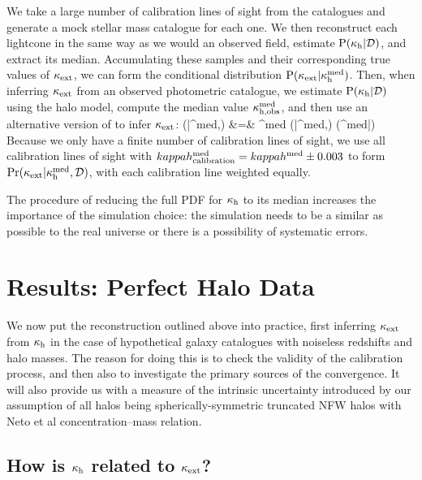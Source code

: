 \documentclass[useAMS,usenatbib,a4paper]{mn2e}
\begin{document}
We  take a large number of
calibration lines of sight from the \MS catalogues and generate a mock
stellar mass catalogue for each one. We then reconstruct each lightcone in the
same way as we would an observed field,
estimate ${\rm P}(\kappa_{\rm h}|{\mathcal{D}})$, and extract its median. Accumulating
these samples and their corresponding true values of $\kappa_{\rm ext}$, we can form the 
conditional distribution ${\rm P}(\kappa_{\rm ext}|\kappa_{\rm h}^{\rm med})$. 
Then, when inferring $\kappa_{\rm ext}$ from an observed photometric catalogue, we 
estimate ${\rm P}(\kappa_{\rm h}|{\mathcal{D}})$ 
using the halo model, compute the median value 
$\kappa_{\rm h,obs}^{\rm med}$, and then use an alternative
version of 
 to infer $\kappa_{\rm ext}$: 
\bea
\Pr(\kappax|\kappah^{\rm med},) &=& \int \dee\kappah^{\rm med} 
   \Pr(\kappax|\kappah^{\rm med},) \Pr(\kappah^{\rm med}|) \notag \\
\label{eq:calkappaconv}   
\eea
Because we only have a finite number of calibration lines of sight, we use all calibration
lines of sight with $kappah_{\rm calibration}^{\rm med} = kappah^{\rm med}\pm0.003$ to form
$\Pr(\kappa_{\rm ext}|\kappa_{\rm h}^{\rm med},\mathcal{D})$, with each calibration line weighted
equally. 

The procedure of reducing the full PDF for $\kappa_{\rm h}$ to its median increases the 
importance of the simulation choice: the simulation needs to be a similar as possible
to the real universe or there is a possibility of systematic errors. 
\section{Results: Perfect Halo Data}
\label{sec:knownMh+z} 

We now put the reconstruction \proceedure outlined above into practice, first
inferring $\kappa_{\rm ext}$ from $\kappa_{\rm h}$ in the case of hypothetical galaxy catalogues
with noiseless redshifts and halo masses. The reason for doing this is to
check the validity of the calibration process, and then also to  investigate
the primary sources of the convergence. It will also provide us with a measure
of the intrinsic uncertainty introduced by our assumption of all halos being
spherically-symmetric truncated NFW halos with Neto et al concentration--mass
relation.


\subsection{How is $\kappa_{\rm h}$ related to $\kappa_{\rm ext}$?}
\end{document}
